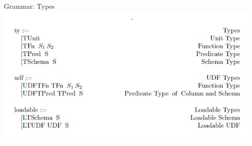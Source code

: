 \begin{frame}{Grammar: Types}
\centering
\includegraphics[scale=0.6]{Images/Grammar/Types.JPG}
\end{frame}

